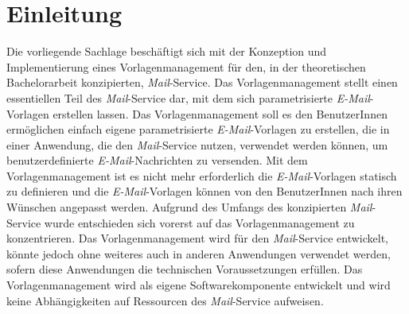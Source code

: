 \chapter{Einleitung}
\label{cha:Einleitung}
Die vorliegende Sachlage beschäftigt sich mit der Konzeption und Implementierung eines Vorlagenmanagement für den, in der theoretischen Bachelorarbeit konzipierten, \emph{Mail}-Service. Das Vorlagenmanagement stellt einen essentiellen Teil des \emph{Mail}-Service dar, mit dem sich parametrisierte \emph{E-Mail}-Vorlagen erstellen lassen. Das Vorlagenmanagement soll es den BenutzerInnen ermöglichen einfach eigene parametrisierte \emph{E-Mail}-Vorlagen zu erstellen, die in einer Anwendung, die den \emph{Mail}-Service nutzen, verwendet werden können, um benutzerdefinierte \emph{E-Mail}-Nachrichten zu versenden. Mit dem Vorlagenmanagement ist es nicht mehr erforderlich die \emph{E-Mail}-Vorlagen statisch zu definieren und die \emph{E-Mail}-Vorlagen können von den BenutzerInnen nach ihren Wünschen angepasst werden.
\newline
\newline
Aufgrund des Umfangs des konzipierten \emph{Mail}-Service wurde entschieden sich vorerst auf das Vorlagenmanagement zu konzentrieren. Das Vorlagenmanagement wird für den \emph{Mail}-Service entwickelt, könnte jedoch ohne weiteres auch in anderen Anwendungen verwendet werden, sofern diese Anwendungen die technischen Voraussetzungen erfüllen. Das Vorlagenmanagement wird als eigene Softwarekomponente entwickelt und wird keine Abhängigkeiten auf Ressourcen des \emph{Mail}-Service aufweisen.
 

